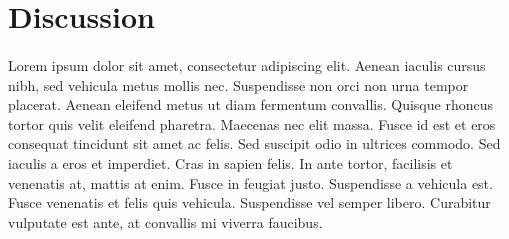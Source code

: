 \documentclass[11pt]{metabo}
\begin{document}
\section{Discussion}
\paragraph{}Lorem ipsum dolor sit amet, consectetur adipiscing elit. Aenean iaculis cursus nibh, sed vehicula metus mollis nec. Suspendisse non orci non urna tempor placerat. Aenean eleifend metus ut diam fermentum convallis. Quisque rhoncus tortor quis velit eleifend pharetra. Maecenas nec elit massa. Fusce id est et eros consequat tincidunt sit amet ac felis. Sed suscipit odio in ultrices commodo. Sed iaculis a eros et imperdiet. Cras in sapien felis. In ante tortor, facilisis et venenatis at, mattis at enim. Fusce in feugiat justo. Suspendisse a vehicula est. Fusce venenatis et felis quis vehicula. Suspendisse vel semper libero. Curabitur vulputate est ante, at convallis mi viverra faucibus.
\end{document}
